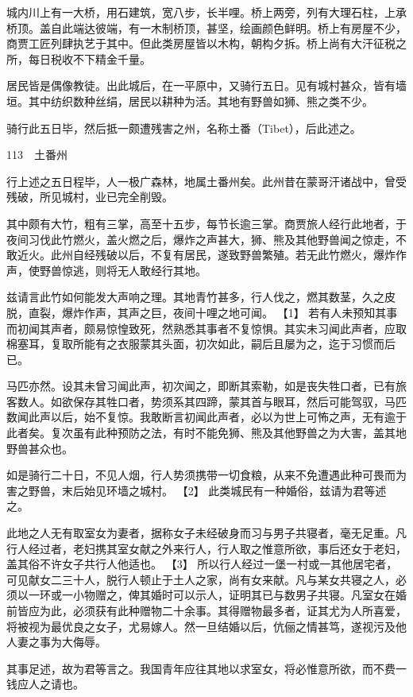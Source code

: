 \documentclass[12pt,UTF8]{ctexbook}
\begin{document}
城内川上有一大桥，用石建筑，宽八步，长半哩。桥上两旁，列有大理石柱，上承桥顶。盖自此端达彼端，有一木制桥顶，甚坚，绘画颜色鲜明。桥上有房屋不少，商贾工匠列肆执艺于其中。但此类房屋皆以木构，朝构夕拆。桥上尚有大汗征税之所，每日税收不下精金千量。

居民皆是偶像教徒。出此城后，在一平原中，又骑行五日。见有城村甚众，皆有墙垣。其中纺织数种丝绢，居民以耕种为活。其地有野兽如狮、熊之类不少。

骑行此五日毕，然后抵一颇遭残害之州，名称土番（Tibet），后此述之。





113　土番州

行上述之五日程毕，人一极广森林，地属土番州矣。此州昔在蒙哥汗诸战中，曾受残破，所见城村，业已完全削毁。

其中颇有大竹，粗有三掌，高至十五步，每节长逾三掌。商贾旅人经行此地者，于夜间习伐此竹燃火，盖火燃之后，爆炸之声甚大，狮、熊及其他野兽闻之惊走，不敢近火。此州自经残破以后，不复有居民，遂致野兽繁殖。若无此竹燃火，爆炸作声，使野兽惊逃，则将无人敢经行其地。

兹请言此竹如何能发大声响之理。其地青竹甚多，行人伐之，燃其数茎，久之皮脱，直裂，爆炸作声，其声之巨，夜间十哩之地可闻。 【1】 若有人未预知其事而初闻其声者，颇易惊惶致死，然熟悉其事者不复惊惧。其实未习闻此声者，应取棉塞耳，复取所能有之衣服蒙其头面，初次如此，嗣后且屡为之，迄于习惯而后已。

马匹亦然。设其未曾习闻此声，初次闻之，即断其索勒，如是丧失牲口者，已有旅客数人。如欲保存其牲口者，势须系其四蹄，蒙其首与眼耳，然后可能驾驭，马匹数闻此声以后，始不复惊。我敢断言初闻此声者，必以为世上可怖之声，无有逾于此者矣。复次虽有此种预防之法，有时不能免狮、熊及其他野兽之为大害，盖其地野兽甚众也。

如是骑行二十日，不见人烟，行人势须携带一切食粮，从来不免遭遇此种可畏而为害之野兽，末后始见环墙之城村。 【2】 此类城民有一种婚俗，兹请为君等述之。

此地之人无有取室女为妻者，据称女子未经破身而习与男子共寝者，毫无足重。凡行人经过者，老妇携其室女献之外来行人，行人取之惟意所欲，事后还女于老妇，盖其俗不许女子共行人他适也。 【3】 所以行人经过一堡一村或一其他居宅者，可见献女二三十人，脱行人顿止于土人之家，尚有女来献。凡与某女共寝之人，必须以一环或一小物赠之，俾其婚时可以示人，证明其已与数男子共寝。凡室女在婚前皆应为此，必须获有此种赠物二十余事。其得赠物最多者，证其尤为人所喜爱，将被视为最优良之女子，尤易嫁人。然一旦结婚以后，伉俪之情甚笃，遂视污及他人妻之事为大侮辱。

其事足述，故为君等言之。我国青年应往其地以求室女，将必惟意所欲，而不费一钱应人之请也。
\end{document}
